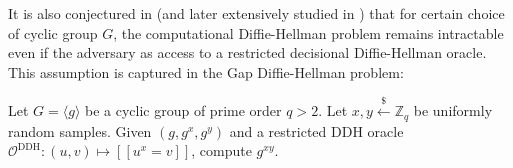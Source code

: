 \documentclass[runningheads]{llncs}
\newcommand{\leftsample}{\stackrel{\$}{\leftarrow}}
\newcommand{\llbrack}{[\![}
\newcommand{\rrbrack}{]\!]}
\begin{document}
It is also conjectured in \cite{DBLP:conf/ctrsa/AbdallaBR01} (and later extensively studied in \cite{DBLP:conf/pkc/OkamotoP01}) that for certain choice of cyclic group $G$, the computational Diffie-Hellman problem remains intractable even if the adversary as access to a restricted decisional Diffie-Hellman oracle. This assumption is captured in the Gap Diffie-Hellman problem:

\begin{definition}
    Let $G = \langle g \rangle$ be a cyclic group of prime order $q > 2$. Let $x, y \leftsample \mathbb{Z}_q$ be uniformly random samples. Given $(g, g^x, g^y)$ and a restricted DDH oracle $\mathcal{O}^\text{DDH}: (u, v) \mapsto \llbrack u^x = v \rrbrack$, compute $g^{xy}$.
\end{definition}
\end{document}
